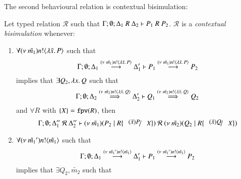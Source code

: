 The second behavioural relation is contextual bisimulation:
%
\begin{definition}\rm
	Let typed relation $\mathcal{R}$ such that
	$\horel{\Gamma}{\Delta_1}{P_1}{\ R\ }{\Delta_2}{P_2}$.
	$\mathcal{R}$ is a {\em contextual bisimulation} whenever:
	\begin{enumerate}
		\item	$\forall \news{\tilde{m_1}} \bactout{n}{\abs{\tilde{x}}{P}}$ such that
			\[
				\horel{\Gamma}{\Delta_1}{P_1}{\by{\news{\tilde{m_1}} \bactout{n}{\abs{\tilde{x}}{P}}}}{\Delta_1'}{P_2}
			\]
			implies that $\exists Q_2, \abs{x}{Q}$ such that
			\[
				\horel{\Gamma}{\Delta_2}{Q_1}{\By{\news{\tilde{m_2}} \bactout{n}{\abs{\tilde{x}}{Q}}}}{\Delta_2'}{Q_2}
			\]
			and $\forall R$ with $\set{X} = \fpv{R}$, %
			then
			\[
				\horel{\Gamma}{\Delta_1''}{\newsp{\tilde{m_1}}{P_2 \Par R\subst{(\tilde{x}) P}{X}}}{\ \mathcal{R}\ }{\Delta_2''}{\newsp{\tilde{m_2}}{Q_2 \Par R\subst{(\tilde{x}) Q}{X}}}
			\]
		\item	$\forall \news{\tilde{m_1}'} \bactout{n}{\tilde{m_1}}$ such that
			\[
				\horel{\Gamma}{\Delta_1}{P_1}{\by{\news{\tilde{m_1}'} \bactout{n}{\tilde{m_1}}}}{\Delta_1'}{P_2}
			\]
			implies that $\exists Q_2, \tilde{m_2}$ such that
			\[
\]
\end{enumerate}
\end{definition}
